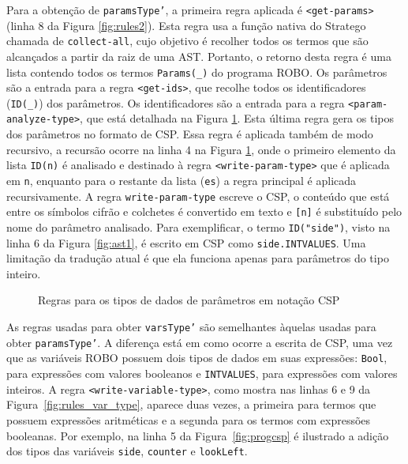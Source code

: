 Para a obtenção de \texttt{paramsType'}, a primeira regra aplicada é \texttt{<get-params>} (linha 8 da Figura \ref{fig:rules2}). Esta regra usa a função nativa do Stratego chamada de \texttt{collect-all}, cujo objetivo é recolher todos os termos que são alcançados a partir da raiz de uma AST. Portanto, o retorno desta regra é uma lista contendo todos os termos \texttt{Params(\_)} do programa ROBO. Os parâmetros são a entrada para a regra \texttt{<get-ids>}, que recolhe todos os identificadores (\texttt{ID(\_)}) dos parâmetros. Os identificadores são a entrada para a regra \texttt{<param-analyze-type>}, que está detalhada na Figura \ref{fig:rules_param_type}. Esta última regra gera os tipos dos parâmetros no formato de CSP. Essa regra é aplicada também de modo recursivo, a recursão ocorre na linha 4 na Figura \ref{fig:rules_param_type}, onde o primeiro elemento da lista \texttt{ID(n)} é analisado e destinado à regra \texttt{<write-param-type>} que é aplicada em \texttt{n}, enquanto para o restante da lista (\texttt{es}) a regra principal é aplicada recursivamente. A regra \texttt{write-param-type} escreve o CSP, o conteúdo que está entre os símbolos cifrão e colchetes é convertido em texto e \texttt{[n]} é substituído pelo nome do parâmetro analisado. Para exemplificar, o termo \texttt{ID("side")}, visto na linha 6 da Figura \ref{fig:ast1}, é escrito em CSP como \texttt{side.INTVALUES}. Uma limitação da tradução atual é que ela funciona apenas para parâmetros do tipo inteiro.

\begin{figure}[!h]
\centering
\caption{Regras para os tipos de dados de parâmetros em notação CSP}

\label{fig:rules_param_type}
\end{figure}

As regras usadas para obter \texttt{varsType'} são semelhantes àquelas usadas para obter \texttt{paramsType'}. A diferença está em como ocorre a escrita de CSP, uma vez que as variáveis ROBO possuem dois tipos de dados em suas expressões: \texttt{Bool}, para expressões com valores booleanos e \texttt{INTVALUES}, para expressões com valores inteiros. A regra \texttt{<write-variable-type>}, como mostra nas linhas 6 e 9 da Figura~\ref{fig:rules_var_type}, aparece duas vezes, a primeira para termos que possuem expressões aritméticas e a segunda para os termos com expressões booleanas. Por exemplo, na linha 5 da Figura~\ref{fig:progcsp} é ilustrado a adição dos tipos das variáveis \texttt{side}, \texttt{counter} e \texttt{lookLeft}.


